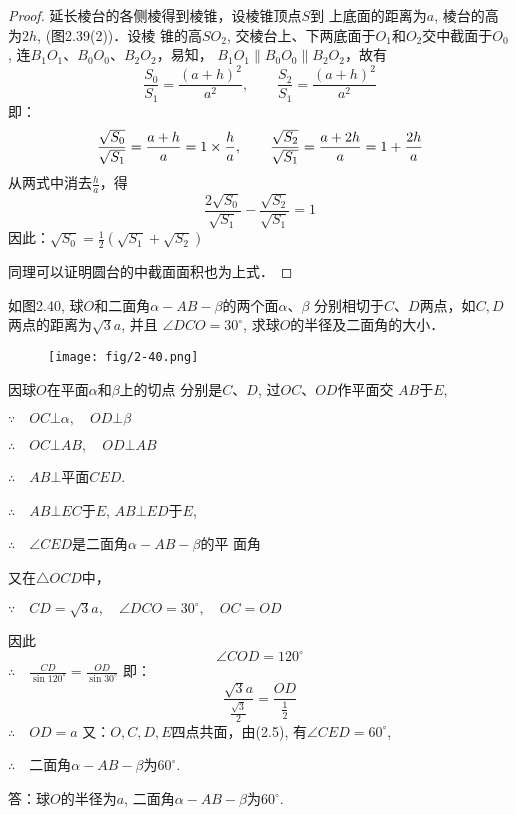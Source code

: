 \begin{proof}
    延长棱台的各侧棱得到棱锥，设棱锥顶点$S$到
    上底面的距离为$a$, 棱台的高为$2h$, (图2.39(2))．设棱
    锥的高$SO_2$, 交棱台上、下两底面于$O_1$和$O_2$交中截面于$O_0$,
    连$B_1O_1$、$B_0O_0$、$B_2O_2$，易知，
$B_1O_1\parallel B_0O_0\parallel B_2O_2$，故有
\[\frac{S_0}{S_1}=\frac{(a+h)^2}{a^2},\qquad \frac{S_2}{S_1}=\frac{(a+h)^2}{a^2}\]
即：
\[\dfrac{\sqrt{S_0}}{\sqrt{S_1}}=\dfrac{a+h}{a}=1\times \dfrac{h}{a},\qquad \dfrac{\sqrt{S_2}}{\sqrt{S_1}}=\dfrac{a+2h}{a}=1+\dfrac{2h}{a}\]
从两式中消去$\frac{h}{a}$，得
\[\frac{2\sqrt{S_0}}{\sqrt{S_1}}-\frac{\sqrt{S_2}}{\sqrt{S_1}}=1\]
因此：$\sqrt{S_0}=\frac{1}{2}\left(\sqrt{S_1}+\sqrt{S_2}\right)$

同理可以证明圆台的中截面面积也为上式．
\end{proof}


\begin{example}
    如图2.40, 球$O$和二面角$\alpha-AB-\beta$的两个面$\alpha$、$\beta$
分别相切于$C$、$D$两点，如$C,D$两点的距离为$\sqrt{3}a$, 并且
$\angle DCO=30^{\circ}$, 求球$O$的半径及二面角的大小．
\end{example}

\begin{figure}[htp]
    \centering
 \texttt{[image: fig/2-40.png]}   
    \caption{}
\end{figure}

\begin{solution}
    因球$O$在平面$\alpha$和$\beta$上的切点
分别是$C$、$D$, 过$OC$、$OD$作平面交
$AB$于$E$,

$\because\quad OC\bot\alpha,\quad OD\bot\beta$

$\therefore\quad OC\bot AB,\quad OD\bot AB$

$\therefore\quad AB\bot$平面$CED$.

$\therefore\quad AB\bot EC$于$E$, $AB\bot ED$于$E$,

$\therefore\quad \angle CED$是二面角$\alpha-AB-\beta$的平
面角

又在$\triangle OCD$中，

$\because\quad CD=\sqrt{3}a,\quad \angle DCO=30^{\circ},\quad 
OC=OD$

因此
\begin{equation}
    \angle COD=120^{\circ}
\end{equation}
$\therefore\quad \frac{CD}{\sin120^{\circ}}=\frac{OD}{\sin30^{\circ}}$
即：
\[\frac{\sqrt{3}a}{\frac{\sqrt{3}}{2}}=\frac{OD}{\frac{1}{2}}\]
$\therefore\quad OD=a$
又：$O,C,D,E$四点共面，由(2.5), 有$\angle CED=60^{\circ}$,

$\therefore\quad $二面角$\alpha-AB-\beta$为$60^{\circ}$.

答：球$O$的半径为$a$, 二面角$\alpha-AB-\beta$为$60^{\circ}$.
\end{solution}


